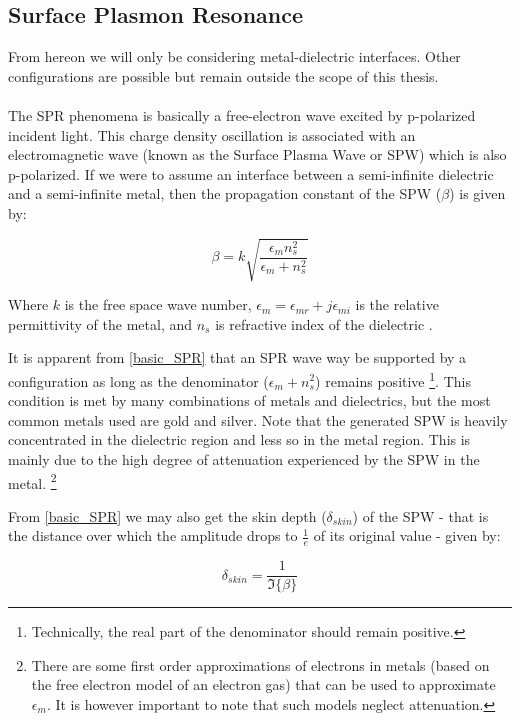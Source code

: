 \subsection{Surface Plasmon Resonance}

From hereon we will only be considering metal-dielectric interfaces. Other configurations are possible but remain outside the scope of this thesis. \\
\\
The SPR phenomena is basically a free-electron wave excited by p-polarized incident light. This charge density oscillation is associated with an electromagnetic wave (known as the Surface Plasma Wave or SPW) which is also p-polarized. If we were to assume an interface between a semi-infinite dielectric and a semi-infinite metal, then the propagation constant of the SPW ($\beta$) is given by:

\begin{equation}\label{basic_SPR}
\beta = k \sqrt{\frac{\epsilon_m n_s^2}{\epsilon_m + n_s^2}}
\end{equation}

Where $k$ is the free space wave number, $\epsilon_m = \epsilon_{mr} + j \epsilon_{mi}$ is the relative permittivity of the metal, and $n_s$ is refractive index of the dielectric \cite{SPR_sensor_review}.

It is apparent from \autoref{basic_SPR} that an SPR wave way be supported by a configuration as long as the denominator ($\epsilon_m + n_s^2$) remains positive \footnote{Technically, the real part of the denominator should remain positive.}. This condition is met by many combinations of metals and dielectrics, but the most common metals used are gold and silver. Note that the generated SPW is heavily concentrated in the dielectric region and less so in the metal region. This is mainly due to the high degree of attenuation experienced by the SPW in the metal. \footnote{There are some first order approximations of electrons in metals (based on the free electron model of an electron gas) that can be used to approximate $\epsilon_m$. It is however important to note that such models neglect attenuation.}

From \autoref{basic_SPR} we may also get the skin depth ($\delta_{skin}$) of the SPW - that is the distance over which the amplitude drops to $\frac{1}{e}$ of its original value - given by:

\begin{equation}\label{skin_depth}
\delta_{skin} = \frac{1}{\Im \lbrace\beta \rbrace }
\end{equation}

